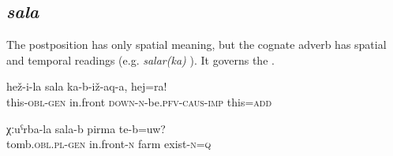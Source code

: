 
\subsection{\textit{sala} }
\label{ssec:postposition sala}
The postposition  has only spatial meaning, but the cognate adverb has spatial and temporal readings (e.g. \textit{salar(ka)} ). It governs the .
%
\begin{exe}
	\ex
	\begin{xlist}
		\ex	\label{Put this before of this, and this also}
		\gll	hež-i-la	sala	ka-b-iž-aq-a,	hej=ra!\\
			this-\textsc{obl}-\textsc{gen}	in.front	\textsc{down-n}-be.\textsc{pfv}-\textsc{caus}-\textsc{imp}	this=\textsc{add}\\
		\glt	{}

		\ex	\label{Is there a farm in front of the graveyard}
		\gll	χːuˁrba-la	sala-b	pirma	te-b=uw?\\
			tomb.\textsc{obl.pl-gen}	in.front-\textsc{n}	farm	exist-\textsc{n}=\textsc{q}\\
		\glt	{}
	\end{xlist}
\end{exe}



\subsection{ }
\label{ssec:postposition sa}


